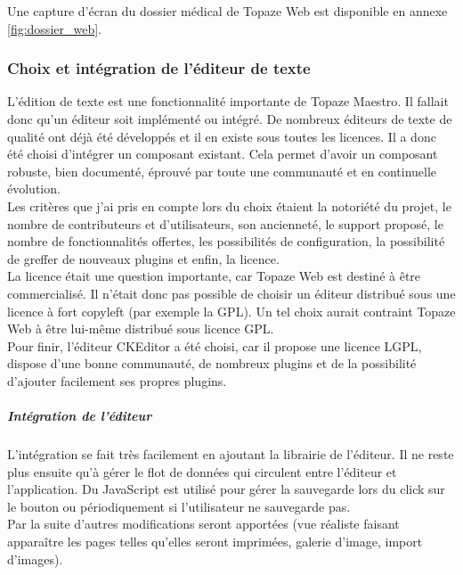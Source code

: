 Une capture d'écran du dossier médical de Topaze Web est disponible en annexe \ref{fig:dossier_web}.

\subsubsection{Choix et intégration de l'éditeur de texte}\label{editeur_section}

L’édition de texte est une fonctionnalité importante de Topaze Maestro. Il fallait donc qu’un éditeur soit implémenté ou intégré. De nombreux éditeurs de texte de qualité ont déjà été développés et il en existe sous toutes les licences. Il a donc été choisi d’intégrer un composant existant. Cela permet d’avoir un composant robuste, bien documenté, éprouvé par toute une communauté et en continuelle évolution.\\

Les critères que j’ai pris en compte lors du choix étaient la notoriété du projet, le nombre de contributeurs et d’utilisateurs, son ancienneté, le support proposé, le nombre de fonctionnalités offertes, les possibilités de configuration, la possibilité de greffer de nouveaux plugins et enfin, la licence.\\

La licence était une question importante, car Topaze Web est destiné à être commercialisé. Il n’était donc pas possible de choisir un éditeur distribué sous une licence à fort copyleft (par exemple la GPL). Un tel choix aurait contraint Topaze Web à être lui-même distribué sous licence GPL.\\

Pour finir, l’éditeur CKEditor a été choisi, car il propose une licence LGPL, dispose d’une bonne communauté, de nombreux plugins et de la possibilité d’ajouter facilement ses propres plugins.

\subparagraph*{Intégration de l’éditeur\\}
L’intégration se fait très facilement en ajoutant la librairie de l’éditeur. Il ne reste plus ensuite qu’à gérer le flot de données qui circulent entre l’éditeur et l’application. Du JavaScript est utilisé pour gérer la sauvegarde lors du click sur le bouton ou périodiquement si l’utilisateur ne sauvegarde pas.\\

Par la suite d’autres modifications seront apportées (vue réaliste faisant apparaître les pages telles qu’elles seront imprimées, galerie d’image, import d’images).\\

